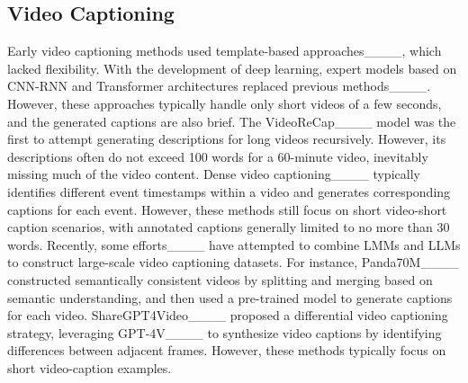 \subsection{Video Captioning}
Early video captioning methods used template-based approaches____, which lacked flexibility. 
With the development of deep learning, expert models based on CNN-RNN and Transformer architectures replaced previous methods____. However, these approaches typically handle only short videos of a few seconds, and the generated captions are also brief. 
The VideoReCap____ model was the first to attempt generating descriptions for long videos recursively. 
However, its descriptions often do not exceed 100 words for a 60-minute video, inevitably missing much of the video content. 
Dense video captioning____ typically identifies different event timestamps within a video and generates corresponding captions for each event. 
However, these methods still focus on short video-short caption scenarios, with annotated captions generally limited to no more than 30 words. 
Recently, some efforts____ have attempted to combine LMMs and LLMs to construct large-scale video captioning datasets. 
For instance, Panda70M____ constructed semantically consistent videos by splitting and merging based on semantic understanding, and then used a pre-trained model to generate captions for each video. 
ShareGPT4Video____ proposed a differential video captioning strategy, leveraging GPT-4V____ to synthesize video captions by identifying differences between adjacent frames. 
However, these methods typically focus on short video-caption examples.